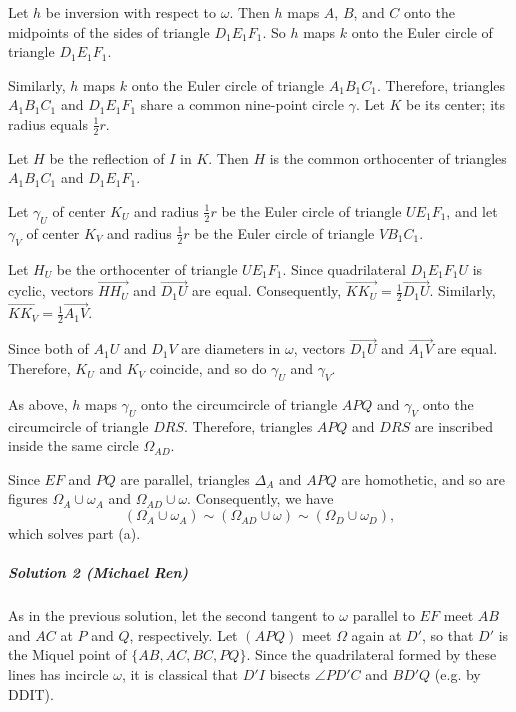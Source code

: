 \documentclass[11pt]{scrartcl}
\begin{document}
Let $h$ be inversion with respect to $\omega$. Then $h$ maps $A$, $B$, and $C$ onto the midpoints of the sides of triangle $D_1E_1F_1$. So $h$ maps $k$ onto the Euler circle of triangle $D_1E_1F_1$.

Similarly, $h$ maps $k$ onto the Euler circle of triangle $A_1B_1C_1$.
Therefore, triangles $A_1B_1C_1$ and $D_1E_1F_1$ share a common nine-point
circle $\gamma$. Let $K$ be its center; its radius equals $\frac{1}{2}r$.

Let $H$ be the reflection of $I$ in $K$. Then $H$ is the common orthocenter of triangles $A_1B_1C_1$ and $D_1E_1F_1$.

Let $\gamma_U$ of center $K_U$ and radius $\frac{1}{2}r$ be the Euler circle of
triangle $UE_1F_1$, and let $\gamma_V$ of center $K_V$ and radius $\frac{1}{2}r$ be
the Euler circle of triangle $VB_1C_1$.

Let $H_U$ be the orthocenter of triangle $UE_1F_1$. Since quadrilateral
$D_1E_1F_1U$ is cyclic, vectors $\overrightarrow{HH_U}$ and
$\overrightarrow{D_1U}$ are equal. Consequently,
$\overrightarrow{KK_U}=\frac{1}{2}\overrightarrow{D_1U}$. Similarly,
$\overrightarrow{KK_V}=\frac{1}{2}\overrightarrow{A_1V}$.

Since both of $A_1U$ and $D_1V$ are diameters in $\omega$, vectors
$\overrightarrow{D_1U}$ and $\overrightarrow{A_1V}$ are equal. Therefore, $K_U$
and $K_V$ coincide, and so do $\gamma_U$ and $\gamma_V$.

As above, $h$ maps $\gamma_U$ onto the circumcircle of triangle $APQ$ and
$\gamma_V$ onto the circumcircle of triangle $DRS$. Therefore, triangles $APQ$
and $DRS$ are inscribed inside the same circle $\Omega_{AD}$.

Since $EF$ and $PQ$ are parallel, triangles $\Delta_A$ and $APQ$ are homothetic,
and so are figures $\Omega_A \cup \omega_A$ and $\Omega_{AD}\cup \omega$.
Consequently, we have
\[(\Omega_A\cup \omega_A)\sim (\Omega_{AD}\cup \omega)\sim (\Omega_D\cup
\omega_D),\]
which solves part (a).


\subparagraph{Solution 2 (Michael Ren)} As in the previous solution, let the
second tangent to $\omega$ parallel to $EF$ meet $AB$ and $AC$ at $P$ and $Q$,
respectively. Let $(APQ)$ meet $\Omega$ again at $D'$, so that $D'$ is the
Miquel point of $\{AB, AC, BC, PQ\}$. Since the quadrilateral formed by these
lines has incircle $\omega$, it is classical that $D'I$ bisects $\angle PD'C$
and $BD'Q$ (e.g. by DDIT).
\end{document}
